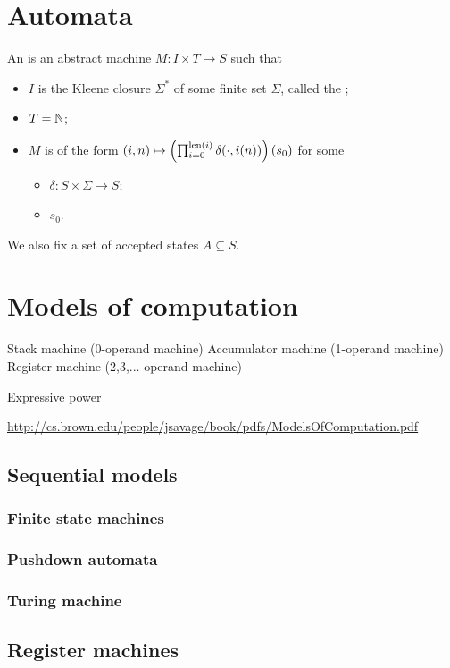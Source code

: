\section{Automata}
\begin{definition}
An  is an abstract machine $M: I\times T \to S$ such that
\begin{itemize}
\item $I$ is the Kleene closure $\Sigma^*$ of some finite set $\Sigma$, called the ;
\item $T = \mathbb{N}$;
\item $M$ is of the form $(i,n)\mapsto \left(\prod_{i=0}^{\operatorname{len}(i)}\delta(\cdot, i(n))\right)(s_0)$ for some
\begin{itemize}
\item {} $\delta: S \times \Sigma \to S$;
\item {} $s_0$.
\end{itemize}
\end{itemize}
We also fix a set of accepted states $A\subseteq S$.


\end{definition}

\section{Models of computation}
Stack machine (0-operand machine)
Accumulator machine (1-operand machine)
Register machine (2,3,... operand machine)

Expressive power

\url{http://cs.brown.edu/people/jsavage/book/pdfs/ModelsOfComputation.pdf}

\subsection{Sequential models}
\subsubsection{Finite state machines}
\subsubsection{Pushdown automata}
\subsubsection{Turing machine}
\subsection{Register machines}
